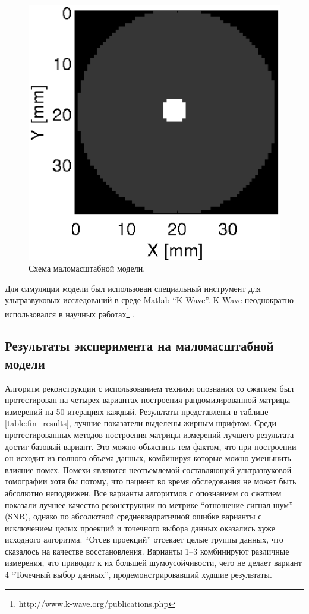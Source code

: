 \documentclass[14pt]{matmex-diploma-custom}
\begin{document}
\begin{figure}[h]
\centering
    \includegraphics[width=.4\textwidth]{pics_eps/model.eps}
    \caption{\small Схема маломасштабной модели.}
    \label{fig:model_1}
\end{figure}

Для симуляции модели был использован специальный инструмент для ультразвуковых исследований в среде Matlab ``K-Wave''. K-Wave неоднократно использовался в научных работах\footnote{http://www.k-wave.org/publications.php} \cite{treeby2010k}. \\


\subsection{Результаты эксперимента на маломасштабной модели}

Алгоритм реконструкции с использованием техники опознания со сжатием был протестирован на четырех вариантах построения рандомизированной матрицы измерений на 50 итерациях каждый. Результаты представлены в таблице \ref{table:fin_results}, лучшие показатели выделены жирным шрифтом. Среди протестированных методов построения матрицы измерений лучшего результата достиг базовый вариант. Это можно объяснить тем фактом, что при построении он исходит из полного объема данных, комбинируя которые можно уменьшить влияние помех. Помехи являются неотъемлемой составляющей ультразвуковой томографии хотя бы потому, что пациент во время обследования не может быть абсолютно неподвижен. Все варианты алгоритмов с опознанием со сжатием показали лучшее качество реконструкции по метрике ``отношение сигнал-шум'' (SNR), однако по абсолютной среднеквадратичной ошибке варианты с исключением целых проекций и точечного выбора данных оказались хуже исходного алгоритма. ``Отсев проекций'' отсекает целые группы данных, что сказалось на качестве восстановления. Варианты 1--3 комбинируют различные измерения, что приводит к их большей шумоусойчивости, чего не делает вариант 4 ``Точечный выбор данных'', продемонстрировавший худшие результаты.
\end{document}
